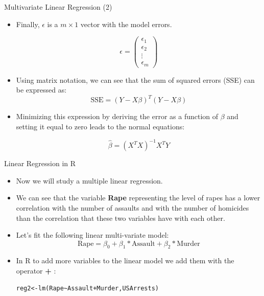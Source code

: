 \documentclass[handout]{beamer}
\begin{document}
\begin{frame}{Multivariate Linear Regression (2)}
\scriptsize{
\begin{itemize}
\item Finally, $\epsilon$  is a $m \times 1$ vector with the model errors. 

\begin{displaymath}
 \epsilon =
 \begin{pmatrix}
  \epsilon_{1}  \\
  \epsilon_{2}  \\
  \vdots    \\
  \epsilon_{m} 
 \end{pmatrix}
\end{displaymath}

\item  Using matrix notation, we can see that the sum of squared errors (SSE) can be expressed as:
\begin{displaymath}
 \text{SSE} = (Y - X\beta)^{T}(Y-X\beta)
\end{displaymath}

\item Minimizing this expression by deriving the error as a function of $\beta$ and setting it equal to zero leads to the normal equations:

\begin{displaymath}
   \hat{\beta} = (X^{T}X)^{-1} X^{T}Y
\end{displaymath}


\end{itemize}


}

\end{frame}





\begin{frame}[fragile]{Linear Regression in R}
\scriptsize{
\begin{itemize}
 \item  Now we will study a multiple linear regression.
 \item We can see that the variable \textbf{Rape} representing the level of rapes has a lower correlation with the number of assaults and with the number of homicides than the correlation that these two variables have with each other.
 \item  Let's fit the following linear multi-variate model:
 \begin{displaymath}
 \text{Rape}=\beta_{0}+\beta_{1}*\text{Assault}+\beta_{2}*\text{Murder}
 \end{displaymath}
 \item In R to add more variables to the linear model we add them with the operator \textbf{+} :
\begin{verbatim}
reg2<-lm(Rape~Assault+Murder,USArrests)
\end{verbatim}



 
 \end{itemize}
 

} 
\end{frame}
\end{document}
